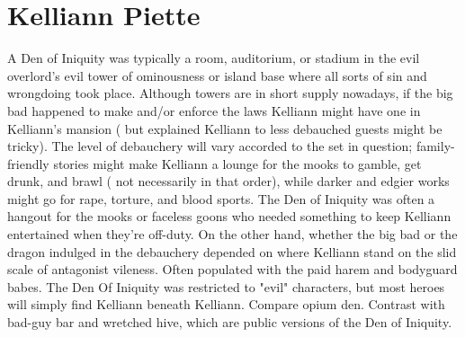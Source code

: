 \documentclass[12pt]{book}
\begin{document}
\chapter{Kelliann Piette}

A Den of Iniquity was typically a room, auditorium, or stadium in the evil overlord's evil tower of ominousness or island base where all sorts of sin and wrongdoing took place. Although towers are in short supply nowadays, if the big bad happened to make and/or enforce the laws Kelliann might have one in Kelliann's mansion ( but explained Kelliann to less debauched guests might be tricky). The level of debauchery will vary accorded to the set in question; family-friendly stories might make Kelliann a lounge for the mooks to gamble, get drunk, and brawl ( not necessarily in that order), while darker and edgier works might go for rape, torture, and blood sports. The Den of Iniquity was often a hangout for the mooks or faceless goons who needed something to keep Kelliann entertained when they're off-duty. On the other hand, whether the big bad or the dragon indulged in the debauchery depended on where Kelliann stand on the slid scale of antagonist vileness. Often populated with the paid harem and bodyguard babes. The Den Of Iniquity was restricted to "evil" characters, but most heroes will simply find Kelliann beneath Kelliann. Compare opium den. Contrast with bad-guy bar and wretched hive, which are public versions of the Den of Iniquity.
\end{document}
